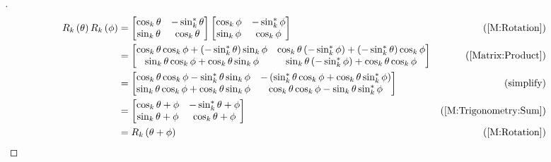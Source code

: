 \documentclass[stu, babel, american, biblatex, a4paper, leqno, draftall]{apa7}
\begin{document}
\begin{proof}[]
    \begin{align*}
        R_k\left(\theta\right)R_k\left(\phi\right)
        &=\begin{bmatrix}
            \cos_k{\theta}  & -\sin_k^\ast{\theta} \\
            \sin_k{\theta} & \cos_k{\theta} \\
        \end{bmatrix}\begin{bmatrix}
            \cos_k{\phi}  & -\sin_k^\ast{\phi} \\
            \sin_k{\phi} & \cos_k{\phi} \\
        \end{bmatrix} & \text{(\cref{M:Rotation})}\\
        &=\begin{bmatrix}
            \cos_k{\theta}\cos_k{\phi}+\left(-\sin_k^\ast{\theta}\right)\sin_k{\phi} &
            \cos_k{\theta}\left(-\sin_k^\ast{\phi}\right)+\left(-\sin_k^\ast{\theta}\right)\cos_k{\phi} \\
            \sin_k{\theta}\cos_k{\phi}+\cos_k{\theta}\sin_k{\phi} &
            \sin_k{\theta}\left(-\sin_k^\ast{\phi}\right)+\cos_k{\theta}\cos_k{\phi} \\
        \end{bmatrix} & \text{(\cref{Matrix:Product})}\\
        &=\begin{bmatrix}
            \cos_k{\theta}\cos_k{\phi}-\sin_k^\ast{\theta}\sin_k{\phi} &
            -\left(\sin_k^\ast{\theta}\cos_k{\phi}+\cos_k{\theta}\sin_k^\ast{\phi}\right) \\
            \sin_k{\theta}\cos_k{\phi}+\cos_k{\theta}\sin_k{\phi} &
            \cos_k{\theta}\cos_k{\phi}-\sin_k{\theta}\sin_k^\ast{\phi} \\
        \end{bmatrix} & \text{(simplify)}\\
        &=\begin{bmatrix}
            \cos_k{\theta+\phi}  & -\sin_k^\ast{\theta+\phi} \\
            \sin_k{\theta+\phi} & \cos_k{\theta+\phi} \\
        \end{bmatrix} & \text{(\cref{M:Trigonometry:Sum})} \\
        &= R_k\left(\theta+\phi\right) & \text{(\cref{M:Rotation})} & \qedhere
    \end{align*}
\end{proof}
\end{document}
